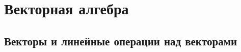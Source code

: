 



\tableofcontents

\linespread{1}

\chapter{Векторная алгебра}
\section{Векторы и линейные операции над векторами}

